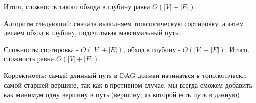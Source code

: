 \documentclass[12pt]{extreport}
\theoremstyle{definition}
\theoremstyle{definition}
\begin{document}
Итого, сложность такого обхода в глубину равна $O(|V|+|E|)$.

\Pr \hspace{1.5mm} Алгоритм следующий: сначала выполняем топологическую сортировку, а затем делаем обход в глубину, подсчитывая максимальный путь.

Сложность: сортировка - $O(|V|+|E|)$, обход в глубину - $O(|V|+|E|)$. Итого, сложность равна $O(|V|+|E|)$.

Корректность: самый длинный путь в DAG должен начинаться в топологически самой старшей вершине, так как в противном случае, мы всегда сможем добавить как минимум одну вершину в путь (вершину, из которой есть путь в данную)
\end{document}
